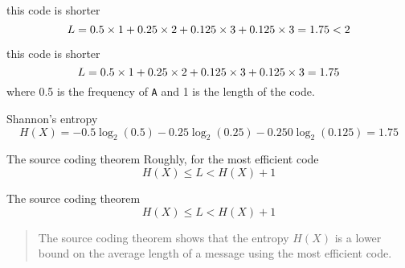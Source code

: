\documentclass{beamer}
\newcommand{\crish}{\color{reddish}}
\newcommand{\cbla}{\color{black}}
\newcommand{\cred}{\color{red}}
\newcommand{\cgre}{\color{green}}
\newcommand{\letter}[1]{\color{blue}\texttt{#1}\color{black}}
\begin{document}
\begin{frame}{this code is shorter}
  \crish
  $$
  L=0.5\times 1 +0.25\times 2 + 0.125\times 3 +
0.125\times 3=\cgre 1.75 < 2
$$
\cbla
\end{frame}


\begin{frame}{this code is shorter}
  \crish
  $$
  L=\cgre 0.5\cbla \times \cred 1\crish +0.25\times 2 + 0.125\times 3 +
0.125\times 3=1.75
$$
\cbla
where \cgre 0.5\cbla{} is the frequency of \letter{A}{} and \cred 1\cbla{} is the length of the code.
\end{frame}


\begin{frame}{Shannon's entropy}
  \crish
  $$
H(X)=-0.5\log_2(0.5)-0.25\log_2(0.25)-0.250\log_2(0.125)=1.75
$$
\cbla
\end{frame}

\begin{frame}{The source coding theorem}
Roughly, for the most efficient code
  \crish
  $$
H(X)\le L < H(X)+1
$$
\cbla
\end{frame}


\begin{frame}{The source coding theorem}
  \crish
  $$
H(X)\le L < H(X)+1
$$
\cbla
\begin{quote}
  The source coding theorem shows that the entropy $H(X)$ is a lower
  bound on the average length of a message using the most efficient
  code.
\end{quote}
\end{frame}
\end{document}
